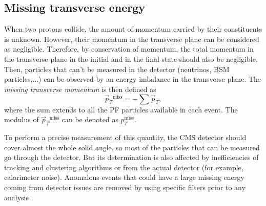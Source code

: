 \documentclass[../main.tex]{subfiles}
\begin{document}
\subsection{Missing transverse energy}
\label{intro:subsec:met}

When two protons collide, the amount of momentum carried by their constituents is unknown. However, their momentum in the transverse plane can be considered as negligible. Therefore, by conservation of momentum, the total momentum in the transverse plane in the initial and in the final state should also be negligible. Then, particles that can't be measured in the detector (neutrinos, BSM particles,...) can be observed by an energy imbalance in the transverse plane. The \textit{missing transverse momentum} is then defined as
\begin{equation}
	\vec{p}_T{}^{\text{miss}} = - \sum \vec{p}_T,
\end{equation}
where the sum extends to all the PF particles available in each event. The modulus of $\vec{p}_T{}^{\text{miss}}$ can be denoted as $p_T^{\text{miss}}$.

To perform a precise measurement of this quantity, the CMS detector should cover almost the whole solid angle, so most of the particles that can be measured go through the detector. But its determination is also affected by inefficiencies of tracking and clustering algorithms or from the actual detector (for example, calorimeter noise). Anomalous events that could have a large missing energy coming from detector issues are removed by using specific filters prior to any analysis \cite{intro:id:met}.
\end{document}
